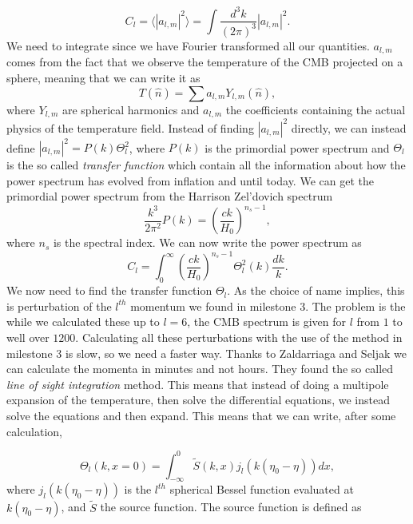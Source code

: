 \documentclass[a4paper,norsk, 10pt]{article}
\begin{document}
\begin{equation}
C_l = \langle |a_{l,m}|^2\rangle = \int \frac{d^3 k}{(2\pi)^3}|a_{l,m}|^2.
\end{equation}
We need to integrate since we have Fourier transformed all our quantities. $a_{l,m}$ comes from the fact that we observe the temperature of the CMB projected on a sphere, meaning that we can write it as 
\begin{equation}
T(\hat{n}) = \sum a_{l,m} Y_{l,m}(\hat{n}),
\end{equation}
where $Y_{l,m}$ are spherical harmonics and $a_{l,m}$ the coefficients containing the actual physics of the temperature field. Instead of finding $|a_{l,m}|^2$ directly, we can instead define $|a_{l,m}|^2 = P(k)\Theta_l^2$, where $P(k)$ is the primordial power spectrum and $\Theta_l$ is the so called \textit{transfer function} which contain all the information about how the power spectrum has evolved from inflation and until today. We can get the primordial power spectrum from the Harrison Zel'dovich spectrum 
\begin{equation}\label{eq:P}
\frac{k^3}{2\pi^2}P(k) = \left(\frac{ck}{H_0}\right)^{n_s - 1},
\end{equation}
where $n_s$ is the spectral index. We can now write the power spectrum as
\begin{equation}\label{eq:Cl}
C_l = \int^{\infty}_{0}\left(\frac{ck}{H_0}\right)^{n_s - 1} \Theta_l^2(k) \frac{dk}{k}.
\end{equation}
We now need to find the transfer function $\Theta_l$. As the choice of name implies, this is perturbation of the $l^{th}$ momentum we found in milestone 3. The problem is the while we calculated these up to $l = 6$, the CMB spectrum is given for $l$ from $1$ to well over $1200$. Calculating all these perturbations with the use of the method in milestone 3 is slow, so we need a faster way. Thanks to Zaldarriaga and Seljak we can calculate the momenta in minutes and not hours. They found the so called \textit{line of sight integration} method. This means that instead of doing a multipole expansion of the temperature, then solve the differential equations, we instead solve the equations and then expand. This means that we can write, after some calculation,

\begin{equation}\label{eq:Theta}
\Theta_l(k,x=0) = \int_{-\infty}^{0} \tilde{S}(k,x)j_l(k(\eta_0 - \eta)) dx,
\end{equation}
where $j_l(k(\eta_0 - \eta))$ is the $l^{th}$ spherical Bessel function evaluated at $k(\eta_0 - \eta)$, and $\tilde{S}$ the source function. The source function is defined as
\end{document}
